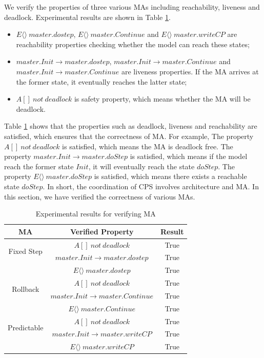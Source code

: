 We verify the properties of three various MAs including reachability, liveness and deadlock. Experimental results are shown in Table \ref{ta_r}.

\begin{itemize}
\item
$E \langle\rangle ~master.dostep$, $E\langle\rangle~master.Continue$ and $E\langle\rangle~master.writeCP$ are reachability properties checking whether the model can reach these states;
\item
$master.Init \rightarrow master.dostep$, $master.Init \rightarrow master.Continue$ and $master.Init \rightarrow master.Continue$ are liveness properties. If the MA arrives at the former state, it eventually reaches the latter state;
\item
$A[]~not~deadlock$ is safety property, which means whether the MA will be deadlock.
\end{itemize}

Table \ref{ta_r} shows that the properties such as deadlock, liveness and reachability are satisfied, which ensures that the correctness of MA. For example, The property $A[]~not~deadlock$ is satisfied, which means the MA is deadlock free. The property $master.Init \rightarrow master.doStep$ is satisfied, which means if the model reach the former state $Init$, it will eventually reach the state $doStep$. The property $E\langle\rangle~master.doStep$ is satisfied, which means there exists a reachable state $doStep$.  In short, the coordination of CPS involves architecture and MA. In this section, we have verified the correctness of various MAs.
\begin{table}
\caption{Experimental results for verifying MA}
\centering
\begin{tabular}{c c c}
        \hline
        MA & Verified Property & Result\\
        \hline
        \multirow{2}{2.0cm}{Fixed Step}
                & $A[]~not~deadlock$ & True\\
                & $master.Init \rightarrow master.dostep$ & True\\
                & $E\langle\rangle~master.dostep$ & True\\

        \hline
        \multirow{2}{2.0cm}{Rollback}
                & $A[]~not~deadlock$ & True\\
                & $master.Init \rightarrow master.Continue$ & True\\
                & $E\langle\rangle~master.Continue$ & True\\

        \hline
        \multirow{2}{2.0cm}{Predictable}
                & $A[]~not~deadlock$ & True\\
                & $master.Init \rightarrow  master.writeCP$ & True\\
                & $E\langle\rangle~master.writeCP$ & True\\
        \hline
\end{tabular}
\label{ta_r}
\end{table}

